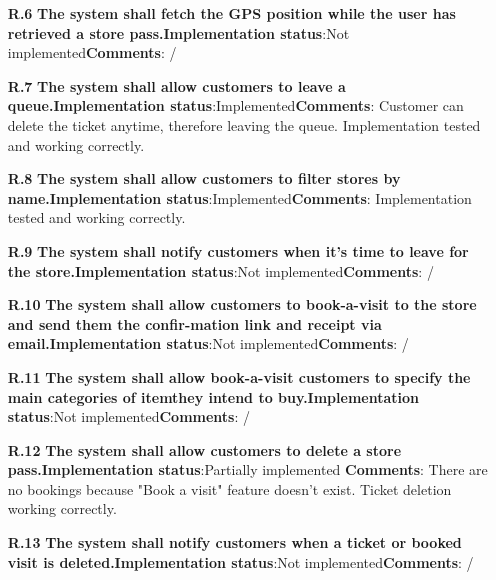 \begin{itemize}
\item[\textbf{R.6}]\textbf{The system shall fetch the GPS position while the user has retrieved a store pass.}\newline \textbf{Implementation status}:Not implemented\newline \textbf{Comments}: /
\item[\textbf{R.7}]\textbf{The system shall allow customers to leave a queue.}\newline \textbf{Implementation status}:Implemented\newline \textbf{Comments}: Customer can delete the ticket anytime, therefore leaving the queue. Implementation tested and working correctly.
\item[\textbf{R.8}]\textbf{The system shall allow customers to filter stores by name.}\newline \textbf{Implementation status}:Implemented\newline \textbf{Comments}: Implementation tested and working correctly.
\item[\textbf{R.9}]\textbf{The system shall notify customers when it’s time to leave for the store.}\newline \textbf{Implementation status}:Not implemented\newline \textbf{Comments}: /
\item[\textbf{R.10}]\textbf{The system shall allow customers to book-a-visit to the store and send them the confir-mation link and receipt via email.}\newline \textbf{Implementation status}:Not implemented\newline \textbf{Comments}: /
\item[\textbf{R.11}]\textbf{The system shall allow book-a-visit customers to specify the main categories of itemthey intend to buy.}\newline \textbf{Implementation status}:Not implemented\newline \textbf{Comments}: /
\item[\textbf{R.12}]\textbf{The system shall allow customers to delete a store pass.}\newline \textbf{Implementation status}:Partially implemented \newline \textbf{Comments}: There are no bookings because "Book a visit" feature doesn't exist. Ticket deletion working correctly.
\item[\textbf{R.13}]\textbf{The system shall notify customers when a ticket or booked visit is deleted.}\newline \textbf{Implementation status}:Not implemented\newline \textbf{Comments}: /

\end{itemize}
